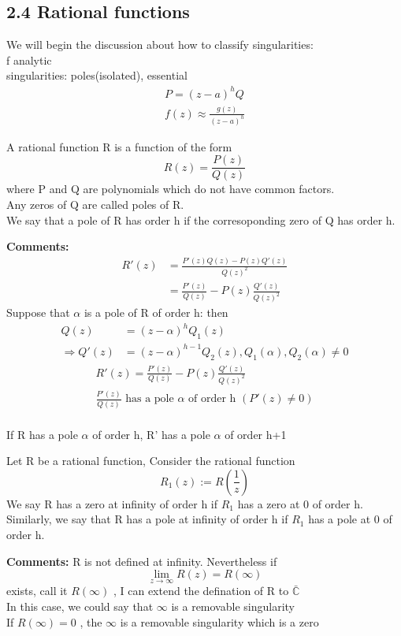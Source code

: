     \subsection{2.4 Rational functions}
    We will begin the discussion about how to classify singularities:
    \\f analytic\\
    singularities: poles(isolated), essential
    \begin{align*}{}{}
    P=(z-a)^hQ\\
    f(z)\approx \frac{g(z)}{(z-a)^h}
    \end{align*}
    \begin{definition}{}
    A rational function R is a function of the form$$
        R(z)=\frac{P(z)}{Q(z)}$$
        where P and Q are polynomials which do not have common factors.\\
        Any zeros of Q are called poles of R.\\
        We say that a pole of R has order h if the corresoponding zero of Q has order h.
    \end{definition}
    \textbf{Comments:}
    \begin{align*}{}{}
    R'(z)&=\frac{P'(z)Q(z)-P(z)Q'(z)}{Q(z)^2}\\
    &=\frac{P'(z)}{Q(z)}-P(z)\frac{Q'(z)}{Q(z)^2}
    \end{align*}
    Suppose that $ \alpha $ is a pole of R of order h: then \begin{align*}{}{}
    Q(z)&=(z-\alpha)^hQ_1(z)\\
    \Rightarrow Q'(z)&=(z-\alpha)^{h-1}Q_2(z), Q_1(\alpha),Q_2(\alpha)\neq 0
    \end{align*}
    \begin{align*}{}{}
    R'(z)=\frac{P'(z)}{Q(z)}-P(z)\frac{Q'(z)}{Q(z)^2}\\
    \frac{P'(z)}{Q(z)} \text{ has a pole }\alpha \text{ of order h }  (P'(z)\neq 0)\\
    \end{align*}
    \begin{lemma}[]{}
    If R has a pole $ \alpha $ of order h, R' has a pole $ \alpha $ of order h+1
    \end{lemma}
    \begin{definition}{}
    Let R be a rational function, Consider the rational function$$
        R_1(z):=R(\frac{1}{z})
    $$ 
    We say R has a zero at infinity of order h if $ R_1 $ has a zero at 0 of order h.\\
    Similarly, we say that R has a pole at infinity of order h if $ R_1 $ has a pole at 0 of order h. 
    \end{definition}
    \textbf{Comments:}
   R is not defined at infinity. Nevertheless if $$
    \lim_{z\rightarrow\infty}R(z)=R(\infty)
   $$ exists, call it $ R(\infty) $ , I can extend the defination of R to $ \bar{\mathbb{C}} $\\
   In this case, we could say that $ \infty $ is a removable singularity \\
   If $ R(\infty)=0 $ , the $ \infty $ is a removable singularity which is a zero\\ 
